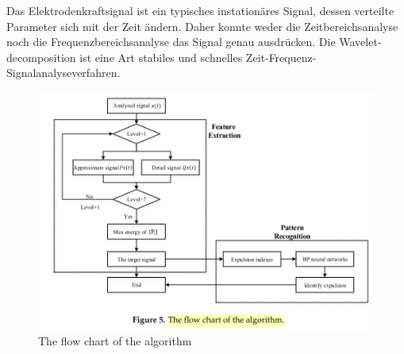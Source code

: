 \documentclass[english,ngerman]{tudscrreprt}
\begin{document}
Das Elektrodenkraftsignal ist ein typisches instationäres Signal, dessen verteilte Parameter sich mit der Zeit ändern. Daher konnte weder die Zeitbereichsanalyse noch die Frequenzbereichsanalyse das Signal genau ausdrücken. Die Wavelet-decomposition ist eine Art stabiles und schnelles Zeit-Frequenz-Signalanalyseverfahren.\\
\begin{figure}[H]
\centering
\includegraphics{./Bilder/The flow chart of the algorithm.png}
\caption{The flow chart of the algorithm}\label{fgg:Wvelets}
\end{figure}
\end{document}
